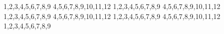 1,2,3,4,5,6,7,8,9
4,5,6,7,8,9,10,11,12
1,2,3,4,5,6,7,8,9
4,5,6,7,8,9,10,11,12
1,2,3,4,5,6,7,8,9
4,5,6,7,8,9,10,11,12
1,2,3,4,5,6,7,8,9
4,5,6,7,8,9,10,11,12
1,2,3,4,5,6,7,8,9